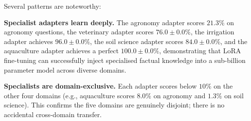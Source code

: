 \documentclass[conference, 10pt]{IEEEtran}
\begin{document}
\begin{table}[htbp]
\centering
\caption{Multi-run evaluation ($n=3$, temperatures 0.25, 0.30, 0.35)
across $K=5$ domains ($\%$, mean $\pm$ s.d.).
The Gossip Protocol achieves tightly clustered high performance while
TIES Merge produces near-zero scores across all five domains.}
\label{tab:variance}
\end{table}

Several patterns are noteworthy:

\textbf{Specialist adapters learn deeply.}
The agronomy adapter scores $21.3\%$ on agronomy questions, the veterinary
adapter scores $76.0 \pm 0.0\%$, the irrigation adapter achieves
$96.0 \pm 0.0\%$, the soil science adapter scores $84.0 \pm 0.0\%$,
and the aquaculture adapter achieves a perfect $100.0 \pm 0.0\%$,
demonstrating that LoRA fine-tuning can successfully inject specialised
factual knowledge into a sub-billion parameter model across diverse domains.

\textbf{Specialists are domain-exclusive.}
Each adapter scores below $10\%$ on the other four domains
(e.g., aquaculture scores $8.0\%$ on agronomy and $1.3\%$ on soil science).
This confirms the five domains are genuinely disjoint; there is no
accidental cross-domain transfer.
\end{document}
